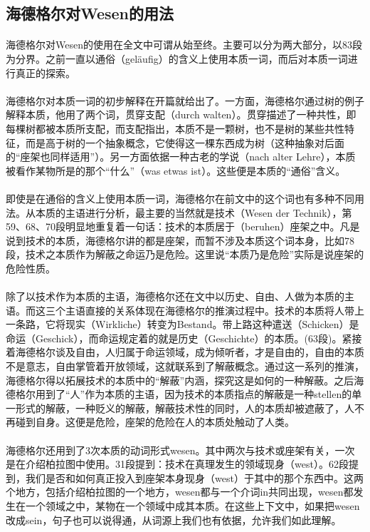 \documentclass{article}
\begin{document}
	\subsection{海德格尔对Wesen的用法}
		\paragraph{}
		海德格尔对Wesen的使用在全文中可谓从始至终。主要可以分为两大部分，以83段为分界。之前一直以通俗（geläufig）的含义上使用本质一词，而后对本质一词进行真正的探索。
		\paragraph{}
		海德格尔对本质一词的初步解释在开篇就给出了。一方面，海德格尔通过树的例子解释本质，他用了两个词，贯穿支配（durch walten）。贯穿描述了一种共性，即每棵树都被本质所支配，而支配指出，本质不是一颗树，也不是树的某些共性特征，而是高于树的一个抽象概念，它使得这一棵东西成为树（这种抽象对后面的“座架也同样适用”）。另一方面依据一种古老的学说（nach alter Lehre），本质被看作某物所是的那个“什么”（was etwas ist）。这些便是本质的“通俗”含义。
		\paragraph{}
		即使是在通俗的含义上使用本质一词，海德格尔在前文中的这个词也有多种不同用法。从本质的主语进行分析，最主要的当然就是技术（Wesen der Technik），第59、68、70段明显地重复着一句话：技术的本质居于（beruhen）座架之中。凡是说到技术的本质，海德格尔讲的都是座架，而暂不涉及本质这个词本身，比如78段，技术之本质作为解蔽之命运乃是危险。这里说“本质乃是危险”实际是说座架的危险性质。
		\paragraph{}
		除了以技术作为本质的主语，海德格尔还在文中以历史、自由、人做为本质的主语。而这三个主语直接的关系体现在海德格尔的推演过程中。技术的本质将人带上一条路，它将现实（Wirkliche）转变为Bestand。带上路这种遣送（Schicken）是命运（Geschick），而命运规定着的就是历史（Geschichte）的本质。(63段)。紧接着海德格尔谈及自由，人归属于命运领域，成为倾听者，才是自由的，自由的本质不是意志，自由掌管着开放领域，这就联系到了解蔽概念。通过这一系列的推演，海德格尔得以拓展技术的本质中的“解蔽”内涵，探究这是如何的一种解蔽。之后海德格尔用到了“人”作为本质的主语，因为技术的本质指点的解蔽是一种stellen的单一形式的解蔽，一种贬义的解蔽，解蔽技术性的同时，人的本质却被遮蔽了，人不再碰到自身。这便是危险，座架的危险在人的本质处触动了人类。
		\paragraph{}
		海德格尔还用到了3次本质的动词形式wesen。其中两次与技术或座架有关，一次是在介绍柏拉图中使用。31段提到：技术在真理发生的领域现身（west）。62段提到，我们是否和如何真正投入到座架本身现身（west）于其中的那个东西中。这两个地方，包括介绍柏拉图的一个地方，wesen都与一个介词in共同出现，wesen都发生在一个领域之中，某物在一个领域中成其本质。在这些上下文中，如果把wesen改成sein，句子也可以说得通，从词源上我们也有依据，允许我们如此理解。
\end{document}
